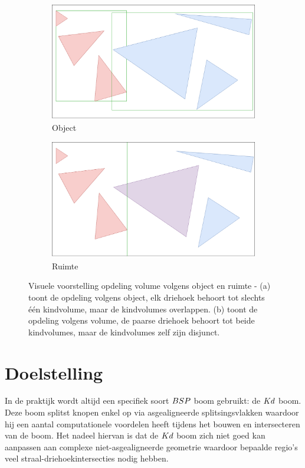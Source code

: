 \begin{figure}
    \centering
    \begin{subfigure}[t]{0.49\linewidth}
        \centering
    \includegraphics[width=\linewidth]{img/objectSplit}
    \caption{Object}
    \label{fig:opdeling-object} 
    \end{subfigure}
    \begin{subfigure}[t]{0.5\linewidth}
        \centering
    \includegraphics[width=\linewidth]{img/volumeSplit}
    \caption{Ruimte}
    \label{fig:opdeling-ruimte} 
    \end{subfigure}
    \caption[Visuele voorstelling opdeling volume volgens object en ruimte]%
{Visuele voorstelling opdeling volume volgens object en ruimte - \small (a) toont de opdeling volgens object, elk driehoek behoort tot slechts één kindvolume, maar de kindvolumes overlappen. (b) toont de opdeling volgens volume, de paarse driehoek behoort tot beide kindvolumes, maar de kindvolumes zelf zijn disjunct. }
\label{fig:opdeling}
\end{figure}

\section{Doelstelling}
In de praktijk wordt altijd een specifiek soort $BSP$ boom gebruikt: de $Kd$ boom.
Deze boom splitst knopen enkel op via asgealigneerde splitsingsvlakken waardoor hij een aantal computationele voordelen heeft tijdens het bouwen en intersecteren van de boom.
Het nadeel hiervan is dat de $Kd$ boom zich niet goed kan aanpassen aan complexe niet-asgealigneerde geometrie waardoor bepaalde regio's veel straal-driehoekintersecties nodig hebben.\\

